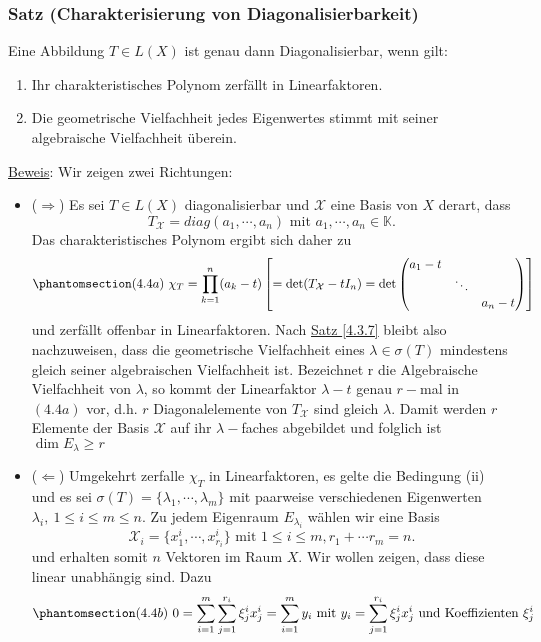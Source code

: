 \subsubsection{Satz (Charakterisierung von Diagonalisierbarkeit)}
\label{4.4.3}
Eine Abbildung $T\in L(X)$ ist genau dann Diagonalisierbar, wenn gilt:
\renewcommand{\labelenumi}{(\roman{enumi})}
\begin{enumerate}
\item Ihr charakteristisches Polynom zerfällt in Linearfaktoren.
\item Die geometrische Vielfachheit jedes Eigenwertes stimmt mit seiner algebraische Vielfachheit überein.
\end{enumerate}
\underline{Beweis}:
Wir zeigen zwei Richtungen:
\renewcommand{\labelitemi}{}
\begin{itemize}
\item ($\Rightarrow$) Es sei $T\in L(X)$ diagonalisierbar und $\mathcal{X}$ eine Basis von $X$ derart, dass \[T_\mathcal{X}=diag(a_1,\cdots ,a_n)\text{ mit }a_1,\cdots ,a_n\in\mathbb{K}.\]  Das charakteristisches Polynom ergibt sich daher zu 
\[\phantomsection\label{4.4a}(4.4a)\ \chi _T=\prod _{k=1}^n (a_k -t)\left[=\det (T_\mathcal{X}-tI_n)=\det \begin{pmatrix}a_1-t & \ & \ \\ \ & \ddots & \ \\ \ & \ & a_n-t\end{pmatrix}\right]\]
und zerfällt offenbar in Linearfaktoren.  Nach \hyperref[4.3.7]{Satz \ref{4.3.7}} bleibt also nachzuweisen, dass die geometrische Vielfachheit eines $\lambda \in \sigma (T)$ mindestens gleich seiner algebraischen Vielfachheit ist.  Bezeichnet r die Algebraische Vielfachheit von $\lambda$, so kommt der Linearfaktor $\lambda -t$ genau $r-$mal in \hyperref[4.4a]{$(4.4a)$} vor, d.h. $r$ Diagonalelemente von $T_\mathcal{X}$ sind gleich $\lambda$.  Damit werden $r$ Elemente der Basis $\mathcal{X}$ auf ihr $\lambda -$faches abgebildet und folglich ist $\dim E_\lambda \geq r$
\item ($\Leftarrow$) Umgekehrt zerfalle $\chi _T$ in Linearfaktoren, es gelte die Bedingung (ii) und es sei $\sigma (T)=\{\lambda _1,\cdots,\lambda _m\}$ mit paarweise verschiedenen Eigenwerten $\lambda _i,\ 1\leq i\leq m\leq n$.  Zu jedem Eigenraum $E_{\lambda _i}$ wählen wir eine Basis
\[\mathcal{X}_i=\{x_1^i,\cdots ,x_{r_i}^i\}\text{ mit }1\leq i\leq m,r_1+\cdots r_m=n.\]
und erhalten somit $n$ Vektoren im Raum $X$.  Wir wollen zeigen, dass diese linear unabhängig sind.  Dazu 
\[\phantomsection\label{4.4b}(4.4b)\ 0=\sum _{i=1}^m \sum _{j=1}^{r_i}\xi _j^ix_j^i=\sum _{i=1}^m y_i\text{ mit } y_i=\sum _{j=1}^{r_i}\xi _j^i x_j^i\text{ und Koeffizienten }\xi _j^i\]

\end{itemize}
